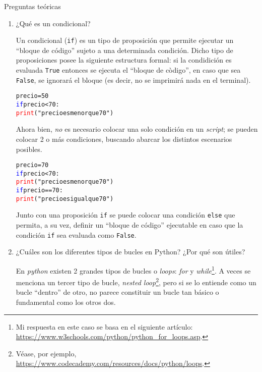 \documentclass{article}
\begin{document}
\begin{center}
  \LARGE{Preguntas teóricas}    \\
\end{center}

\vspace{0.5cm}

\begin{enumerate}
\item ¿Qué es un condicional?

\par\hspace{5pt} Un condicional (\verb|if|) es un tipo de proposición que permite ejecutar un ``bloque de código'' sujeto a una determinada condición. Dicho tipo de proposiciones posee la siguiente estructura formal: si la condidición es evaluada \verb|True| entonces se ejecuta el ``bloque de còdigo'', en caso que sea \verb|False|, se ignorará el bloque (es decir, no se imprimirá nada en el terminal).  
\begin{tcolorbox}
\begin{alltt}
precio = 50
\textcolor{blue}{if} precio < 70:
    \textcolor{red}{print}("precio es menor que 70")
\end{alltt}        
\end{tcolorbox}
\par\hspace{5pt} Ahora bien, \emph{no} es necesario colocar una solo condición en un \emph{script}; se pueden colocar 2 o más condiciones, buscando abarcar los distintos escenarios posibles.
\begin{tcolorbox}
\begin{alltt}
precio = 70
\textcolor{blue}{if} precio < 70:
    \textcolor{red}{print}("precio es menor que 70")
\textcolor{blue}{if} precio == 70:
    \textcolor{red}{print}("precio es igual que 70")
\end{alltt}        
\end{tcolorbox}
\par\hspace{5pt} Junto con una proposición \verb|if| se puede colocar una condición \verb|else| que permita, a su vez, definir un ``bloque de código'' ejecutable en caso que la condición \verb|if| sea evaluada como \verb|False|.
\vspace{0.5cm}

\item ¿Cuáles son los diferentes tipos de bucles en Python? ¿Por qué son útiles?

  \par \hspace{5pt} En \emph{python} existen 2 grandes tipos de bucles o \emph{loops}: \emph{for} y \emph{while}\footnote{Mi respuesta en este caso se basa en el siguiente artículo:  \url{https://www.w3schools.com/python/python_for_loops.asp}.}. A veces se menciona un tercer tipo de bucle, \emph{nested loop}\footnote{Véase, por ejemplo, \url{https://www.codecademy.com/resources/docs/python/loops}.}, pero si se lo entiende como un bucle ``dentro'' de otro, no parece constituir un bucle tan básico o fundamental como los otros dos.


\end{enumerate}
\end{document}
